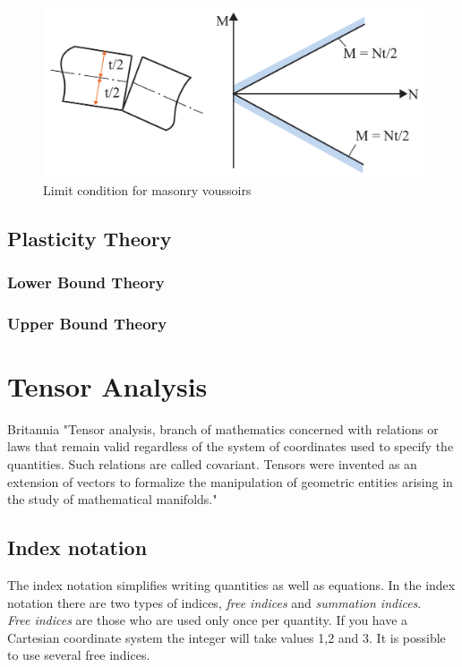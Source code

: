 \begin{figure}[H]
\centering
\includegraphics[width=0.9\linewidth ]{figure/Theory/Plasticity.pdf}
\caption{Limit condition for masonry voussoirs}
\end{figure}


\subsection{Plasticity Theory}
\subsubsection{Lower Bound Theory}
\subsubsection{Upper Bound Theory}

\section{Tensor Analysis}

Britannia
"Tensor analysis, branch of mathematics concerned with relations or laws that remain valid regardless of the system of coordinates used to specify the quantities. Such relations are called covariant. Tensors were invented as an extension of vectors to formalize the manipulation of geometric entities arising in the study of mathematical manifolds."

\subsection{Index notation}
The index notation simplifies writing quantities as well as equations. In the index notation there are two types of indices, \textit{free indices} and \textit{summation indices}.\\

\textit{Free indices} are those who are used only once per quantity. If you have a Cartesian coordinate system the integer will take values 1,2 and 3. It is possible to use several free indices.

